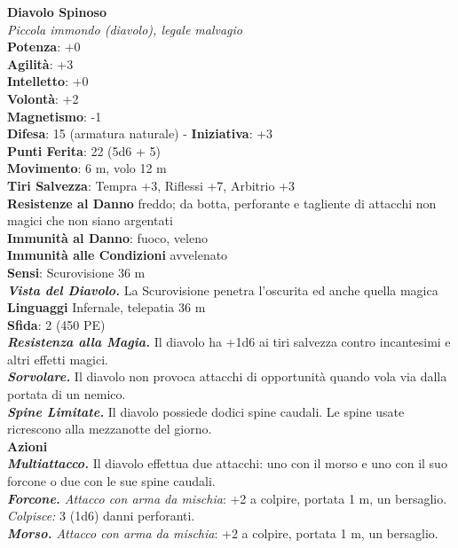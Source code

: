 \begin{multicols}{2}
\medskip\textbf{Diavolo Spinoso}\\
\emph{Piccola immondo (diavolo), legale malvagio}\\
\textbf{Potenza}: +0\\
\textbf{Agilità}: +3\\
\textbf{Intelletto}: +0\\
\textbf{Volontà}: +2\\
\textbf{Magnetismo}: -1\\
\textbf{Difesa}: 15 (armatura naturale) - \textbf{Iniziativa}: +3\\
\textbf{Punti Ferita}: 22 (5d6 + 5)\\
\textbf{Movimento}: 6 m, volo 12 m\\
\textbf{Tiri Salvezza}: Tempra +3, Riflessi +7, Arbitrio +3\\
\textbf{Resistenze al Danno} freddo; da botta, perforante e tagliente di attacchi non magici che non siano argentati\\
\textbf{Immunità al Danno}: fuoco, veleno \\
\textbf{Immunità alle Condizioni} avvelenato\\
\textbf{Sensi}: Scurovisione 36 m\\
\emph{\textbf{Vista del Diavolo.}} La Scurovisione penetra l'oscurita ed anche quella magica\\
\textbf{Linguaggi} Infernale, telepatia 36 m \\
\textbf{Sfida}: 2 (450 PE)\smallskip\\
\emph{\textbf{Resistenza alla Magia.}} Il diavolo ha +1d6 ai tiri salvezza contro incantesimi e altri effetti magici.\\
\emph{\textbf{Sorvolare.}} Il diavolo non provoca attacchi di opportunità quando vola via dalla portata di un nemico.\\
\emph{\textbf{Spine Limitate.}} Il diavolo possiede dodici spine caudali. Le spine usate ricrescono alla mezzanotte del giorno.\\
\smallskip\textbf{Azioni}\\
\emph{\textbf{Multiattacco.}} Il diavolo effettua due attacchi: uno con il morso e uno con il suo forcone o due con le sue spine caudali.\\
\emph{\textbf{Forcone.} Attacco con arma da mischia}: +2 a colpire, portata 1 m, un bersaglio.\\
\emph{Colpisce:} 3 (1d6) danni perforanti. \\
\emph{\textbf{Morso.} Attacco con arma da mischia}: +2 a colpire, portata 1 m, un bersaglio.\\

\end{multicols}
